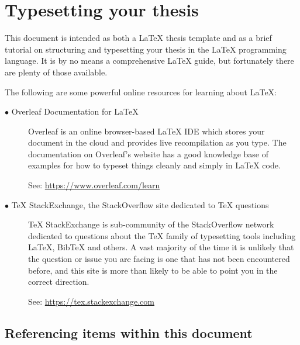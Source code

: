 \chapter{Typesetting your thesis}
	\label{chap:typesetting}
	
This document is intended as both a \LaTeX{} thesis template and as a brief tutorial on structuring and typesetting your thesis in the \LaTeX{} programming language.
It is by no means a comprehensive \LaTeX{} guide, but fortunately there are plenty of those available.
	
The following are some powerful online resources for learning about \LaTeX{}:

	\begin{description}	

		\item[\(\bullet\) Overleaf Documentation for \LaTeX{}]\hfill

Overleaf \cite{overleafdocs} is an online browser-based \LaTeX{} IDE which stores your document in the cloud and provides live recompilation as you type.
The documentation on Overleaf's website has a good knowledge base of examples for how to typeset things cleanly and simply in \LaTeX{} code. 

		\noindent See: {\small \url{https://www.overleaf.com/learn}}

		\item[\(\bullet\) \TeX{} StackExchange, the StackOverflow site dedicated to \TeX{} questions]\hfill

\TeX{} StackExchange \cite{texstackexchange} is sub-community of the StackOverflow network dedicated to questions about the \TeX{} family of typesetting tools including \LaTeX{}, Bib\TeX{} and others.
A vast majority of the time it is unlikely that the question or issue you are facing is one that has not been encountered before, and this site is more than likely to be able to point you in the correct direction. 
		
		\noindent See: {\small \url{https://tex.stackexchange.com}}
		
	\end{description}

	
	\section{Referencing items within this document}

